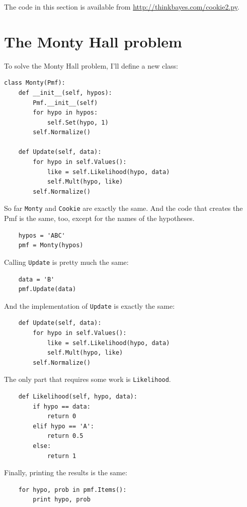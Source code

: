 \documentclass[12pt]{book}
\begin{document}
The code in this section is available from
\url{http://thinkbayes.com/cookie2.py}.


\section{The Monty Hall problem}

To solve the Monty Hall problem, I'll define a new class:

\begin{verbatim}
class Monty(Pmf):
    def __init__(self, hypos):
        Pmf.__init__(self)
        for hypo in hypos:
            self.Set(hypo, 1)
        self.Normalize()

    def Update(self, data):
        for hypo in self.Values():
            like = self.Likelihood(hypo, data)
            self.Mult(hypo, like)
        self.Normalize()
\end{verbatim}

So far \verb"Monty" and \verb"Cookie" are exactly the same.
And the code that creates the Pmf is the same, too, except for
the names of the hypotheses.

\begin{verbatim}
    hypos = 'ABC'
    pmf = Monty(hypos)
\end{verbatim}

Calling \verb"Update" is pretty much the same:

\begin{verbatim}
    data = 'B'
    pmf.Update(data)
\end{verbatim}

And the implementation of \verb"Update" is exactly the same:

\begin{verbatim}
    def Update(self, data):
        for hypo in self.Values():
            like = self.Likelihood(hypo, data)
            self.Mult(hypo, like)
        self.Normalize()
\end{verbatim}

The only part that requires some work is \verb"Likelihood".

\begin{verbatim}
    def Likelihood(self, hypo, data):
        if hypo == data:
            return 0
        elif hypo == 'A':
            return 0.5
        else:
            return 1
\end{verbatim}

Finally, printing the results is the same:

\begin{verbatim}
    for hypo, prob in pmf.Items():
        print hypo, prob
\end{verbatim}
\end{document}
